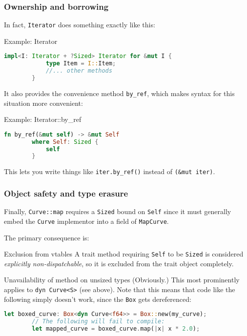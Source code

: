 \documentclass[10pt]{beamer}
\begin{document}
\begin{frame}[fragile]
    \frametitle{Ownership and borrowing}
    In fact, \texttt{Iterator} does something exactly like this:
    \begin{exampleblock}{Example: Iterator}
    \begin{lstlisting}[language=Rust, gobble=8]
        impl<I: Iterator + ?Sized> Iterator for &mut I {
            type Item = I::Item;
            //... other methods
        }
    \end{lstlisting}\pause
    \end{exampleblock}
    It also provides the convenience method \verb|by_ref|, which makes syntax for this situation more convenient:
    \begin{exampleblock}{Example: Iterator::by\_ref}
    \begin{lstlisting}[language=Rust, gobble=8]
        fn by_ref(&mut self) -> &mut Self
        where Self: Sized {
            self
        }
    \end{lstlisting}
    \end{exampleblock}
    This lets you write things like \verb|iter.by_ref()| instead of \verb|(&mut iter)|.
\end{frame}

\begin{frame}[fragile]
    \frametitle{Object safety and type erasure}
    Finally, \texttt{Curve::map} requires a \texttt{Sized} bound on \texttt{Self} since it must generally embed the \texttt{Curve} implementor into a field of \texttt{MapCurve}.\pause
    
    The primary consequence is:
    \begin{alertblock}{Exclusion from vtables}
        A trait method requiring \texttt{Self} to be \texttt{Sized} is considered \emph{explicitly non-dispatchable}, so it is excluded from the trait object completely.
    \end{alertblock}
    \begin{alertblock}{Unavailability of method on unsized types}
        (Obviously.) This most prominently applies to \texttt{dyn Curve<S>} (see above). Note that this means that code like the following simply doesn't work, since the \texttt{Box} gets dereferenced:
    \begin{lstlisting}[language=Rust, gobble=8]
        let boxed_curve: Box<dyn Curve<f64>> = Box::new(my_curve);
        // The following will fail to compile:
        let mapped_curve = boxed_curve.map(|x| x * 2.0);
    \end{lstlisting}
    \end{alertblock}

\end{frame}
\end{document}
